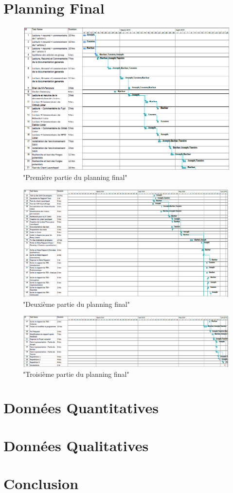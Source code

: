 \documentclass[12pt,a4paper]{report}
\begin{document}
\chapter{Planning Final}
\begin{figure}[!ht]
  	\hspace*{-2cm}   
	\includegraphics[scale=0.73]{"images/final_gantt_duration_1"}
	\caption{"Première partie du planning final"}
\end{figure}

\begin{figure}[!ht]
  	\hspace*{-3cm}   
	\includegraphics[scale=0.67]{"images/final_gantt_duration_2"}
	\caption{"Deuxième partie du planning final"}
\end{figure}

\begin{figure}[!ht]
  	\hspace*{-2cm}   
	\includegraphics[scale=0.63]{"images/final_gantt_duration_3"}
	\caption{"Troisième partie du planning final"}
\end{figure}
\chapter{Données Quantitatives}	
\chapter{Données Qualitatives}
\chapter{Conclusion}
\end{document}
